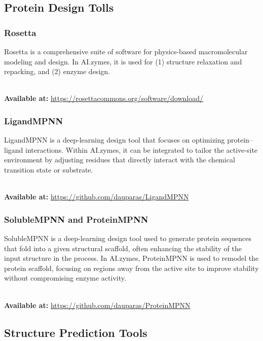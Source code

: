 \documentclass[10pt]{extarticle}
\begin{document}
\subsection{Protein Design Tolls}

\subsubsection{Rosetta}

Rosetta is a comprehensive suite of software for physics-based macromolecular modeling and design. In AI.zymes, it is used for (1) structure relaxation and repacking, and (2) enzyme design.

\\ \textbf{Available at:} \href{https://rosettacommons.org/software/download/}{https://rosettacommons.org/software/download/}


\subsubsection{LigandMPNN}

LigandMPNN is a deep-learning design tool that focuses on optimizing protein–ligand interactions. Within AI.zymes, it can be integrated to tailor the active-site environment by adjusting residues that directly interact with the chemical transition state or substrate.

\\ \textbf{Available at:} \href{https://github.com/dauparas/LigandMPNN}{https://github.com/dauparas/LigandMPNN}


\subsubsection{SolubleMPNN and ProteinMPNN}

SolubleMPNN is a deep-learning design tool used to generate protein sequences that fold into a given structural scaffold, often enhancing the stability of the input structure in the process. In AI.zymes, ProteinMPNN is used to remodel the protein scaffold, focusing on regions away from the active site to improve stability without compromising enzyme activity.

\\ \textbf{Available at:} \href{https://github.com/dauparas/ProteinMPNN}{https://github.com/dauparas/ProteinMPNN}

\subsection{Structure Prediction Tools}
\end{document}
